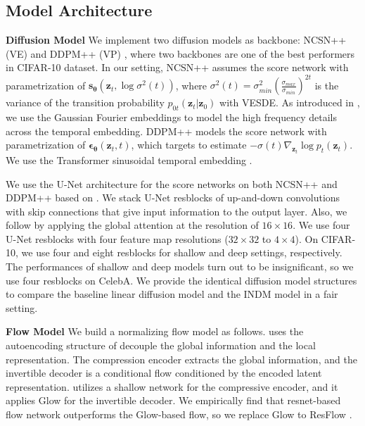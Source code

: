 \documentclass{article}
\theoremstyle{definition}
\theoremstyle{remark}
\begin{document}
	
	\subsection{Model Architecture}
	
	\textbf{Diffusion Model} We implement two diffusion models as backbone: NCSN++ (VE) \citep{song2020score} and DDPM++ (VP) \citep{song2020score}, where two backbones are one of the best performers in CIFAR-10 dataset. In our setting, NCSN++ assumes the score network with parametrization of $\mathbf{s}_{\bm{\theta}}(\mathbf{z}_{t},\log{\sigma^{2}(t)})$, where $\sigma^{2}(t)=\sigma_{min}^{2}(\frac{\sigma_{max}}{\sigma_{min}})^{2t}$ is the variance of the transition probability $p_{0t}(\mathbf{z}_{t}\vert\mathbf{z}_{0})$ with VESDE. As introduced in \citet{song2020score}, we use the Gaussian Fourier embeddings \citep{tancik2020fourier} to model the high frequency details across the temporal embedding. DDPM++ models the score network with parametrization of $\mathbf{\epsilon}_{\bm{\theta}}(\mathbf{z}_{t},t)$, which targets to estimate $-\sigma(t)\nabla_{\mathbf{z}_{t}}\log{p_{t}(\mathbf{z}_{t})}$. We use the Transformer sinusoidal temporal embedding \citep{vaswani2017attention}.
	
	We use the U-Net \citep{ronneberger2015u} architecture for the score networks on both NCSN++ and DDPM++ based on \citep{ho2020denoising}. We stack U-Net resblocks of up-and-down convolutions with skip connections that give input information to the output layer. Also, we follow \citet{ho2020denoising} by applying the global attention at the resolution of $16\times 16$. We use four U-Net resblocks with four feature map resolutions ($32\times 32$ to $4\times 4$). On CIFAR-10, we use four and eight resblocks for shallow and deep settings, respectively. The performances of shallow and deep models turn out to be insignificant, so we use four resblocks on CelebA. We provide the identical diffusion model structures to compare the baseline linear diffusion model and the INDM model in a fair setting.
	
	\textbf{Flow Model} We build a normalizing flow model as follows. \citet{ma2020decoupling} uses the autoencoding structure of decouple the global information and the local representation. The compression encoder extracts the global information, and the invertible decoder is a conditional flow conditioned by the encoded latent representation. \citet{ma2020decoupling} utilizes a shallow network for the compressive encoder, and it applies Glow \cite{kingma2018glow} for the invertible decoder. We empirically find that resnet-based flow network outperforms the Glow-based flow, so we replace Glow to ResFlow \cite{chen2019residual}.
	
\end{document}
